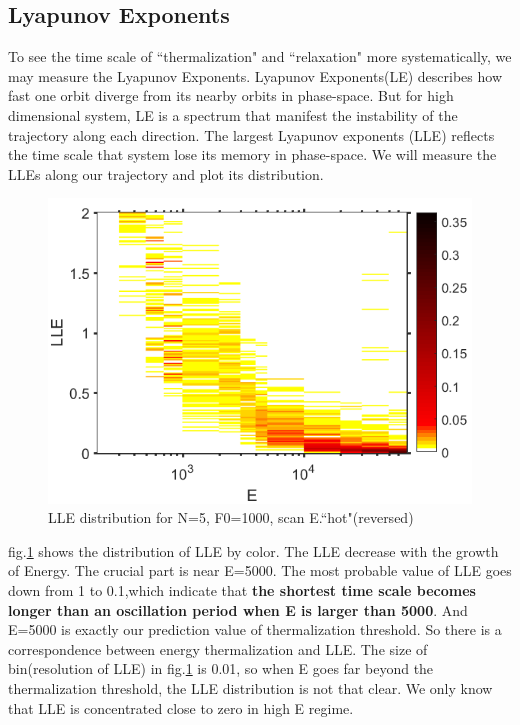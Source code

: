 \documentclass[aps,pre,twocolumn,groupedaddress]{revtex4-1}
\begin{document}
\subsection{Lyapunov Exponents}
To see the time scale of ``thermalization" and ``relaxation" more systematically, we may measure the Lyapunov Exponents. Lyapunov Exponents(LE) describes how fast one orbit diverge from its nearby orbits in phase-space. But for high dimensional system, LE is a spectrum that manifest the instability of the trajectory along each direction. The largest Lyapunov exponents (LLE) reflects the time scale that system lose its memory in phase-space. We will measure the LLEs along our trajectory and plot its distribution.

\begin{figure}[hbtp]
\centering
\includegraphics[scale=0.4]{ZhiyuPictures/LLEdistribution_1_11_pre_hot2_screenshot.png}
\caption{LLE distribution for N=5, F0=1000, scan E.``hot"(reversed)}\label{fig:LLEdistribution1}
\end{figure}



fig.\ref{fig:LLEdistribution1} shows the distribution of LLE by color. The LLE decrease with the growth of Energy. The crucial part is near E=5000. The most probable value of LLE goes down from 1 to 0.1,which indicate that \textbf{the shortest time scale becomes longer than an oscillation period when E is larger than 5000}. And E=5000 is exactly our prediction value of thermalization threshold. So there is a correspondence between energy thermalization and LLE. 
The size of bin(resolution of LLE) in fig.\ref{fig:LLEdistribution1} is 0.01, so when E goes far beyond the thermalization threshold, the LLE distribution is not that clear. We only know that LLE is concentrated close to zero in high E regime.
\end{document}
